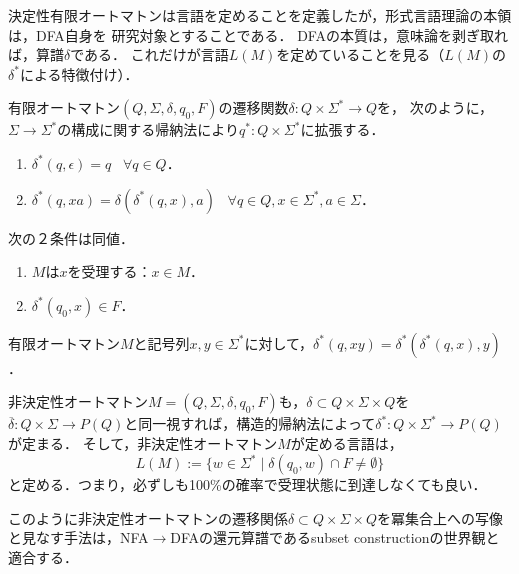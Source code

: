 \documentclass[uplatex, dvipdfmx]{jsreport}
\begin{document}
\begin{tcolorbox}[colframe=ForestGreen, colback=ForestGreen!10!white, breakable]
    決定性有限オートマトンは言語を定めることを定義したが，形式言語理論の本領は，DFA自身を
    研究対象とすることである．
    DFAの本質は，意味論を剥ぎ取れば，算譜$\delta$である．
    これだけが言語$L(M)$を定めていることを見る（$L(M)$の$\delta^*$による特徴付け）．
\end{tcolorbox}

\begin{definition}
    有限オートマトン$(Q,\Sigma,\delta,q_0,F)$の遷移関数$\delta:Q\times\Sigma^*\to Q$を，
    次のように，$\Sigma\to\Sigma^*$の構成に関する帰納法により$q^*:Q\times\Sigma^*$に拡張する．
    \begin{enumerate}
        \item $\delta^*(q,\epsilon)=q\;\;\;\forall q\in Q$．
        \item $\delta^*(q,xa)=\delta(\delta^*(q,x),a)\;\;\;\forall q\in Q,x\in\Sigma^*,a\in\Sigma$．
    \end{enumerate}
\end{definition}

\begin{proposition}[$M$が$x$を受理することの特徴付け]
    次の２条件は同値．
    \begin{enumerate}
        \item $M$は$x$を受理する：$x\in M$．
        \item $\delta^*(q_0,x)\in F$．
    \end{enumerate}
\end{proposition}

\begin{proposition}
    有限オートマトン$M$と記号列$x,y\in\Sigma^*$に対して，$\delta^*(q,xy)=\delta^*(\delta^*(q,x),y)$．
\end{proposition}

\begin{remark}
    非決定性オートマトン$M=(Q,\Sigma,\delta,q_0,F)$も，$\delta\subset Q\times\Sigma\times Q$を$\overline{\delta}:Q\times\Sigma\to P(Q)$と同一視すれば，構造的帰納法によって$\delta^*:Q\times\Sigma^*\to P(Q)$が定まる．
    そして，非決定性オートマトン$M$が定める言語は，
    \[L(M):=\{w\in\Sigma^*\mid \delta(q_0,w)\cap F\ne\emptyset\}\]
    と定める．つまり，必ずしも100\%の確率で受理状態に到達しなくても良い．

    このように非決定性オートマトンの遷移関係$\delta\subset Q\times\Sigma\times Q$を冪集合上への写像と見なす手法は，NFA$\to$DFAの還元算譜であるsubset constructionの世界観と適合する．
\end{remark}
\end{document}
